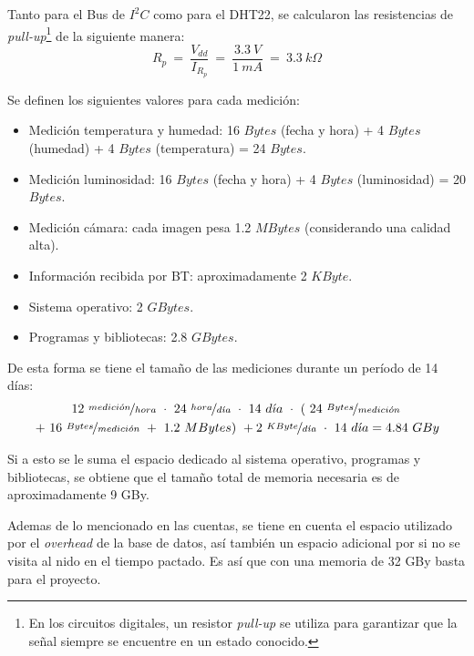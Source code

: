 Tanto para el Bus de $I^2C$ como para el DHT22, se calcularon las resistencias de \textit{pull-up}\footnote{En los circuitos digitales, un resistor \textit{pull-up} se utiliza para garantizar que la señal siempre se encuentre en un estado conocido.} de la siguiente manera:
\begin{equation}
	R_p \ = \  \frac{V_{dd}}{I_{R_p}} \ = \ \frac{3.3 \ V}{1 \ mA} \ = \ 3.3 \ k\Omega  
\end{equation}

Se definen los siguientes valores para cada medición:
\begin{itemize}
	\item Medición temperatura y humedad: 16 $Bytes$ (fecha y hora) + 4 $Bytes$ (humedad) + 4 $Bytes$ (temperatura) = 24 $Bytes$.
	\item Medición luminosidad: 16 $Bytes$ (fecha y hora) + 4 $Bytes$ (luminosidad) = 20 $Bytes$.
	\item Medición cámara: cada imagen pesa 1.2 $MBytes$ \cite{ref:rpicam} (considerando una calidad alta).
	\item Información recibida por BT: aproximadamente 2 $KByte$.
	\item Sistema operativo: 2 $GBytes$.
	\item Programas y bibliotecas: 2.8 $GBytes$.
\end{itemize}

De esta forma se tiene el tamaño de las mediciones durante un período de 14 días:
\begin{multline*}
	12 \ \nicefrac{medici\acute{o}n}{hora} \  \cdot \ 24 \ \nicefrac{hora}{d\acute{\imath}a} \  \cdot \ 14 \ d\acute{\imath}a \  \cdot \ \left( \ 24 \  \nicefrac{Bytes}{medici\acute{o}n} \right. \\ \left. + \ 16 \ \nicefrac{Bytes}{medici\acute{o}n} \ + \ 1.2 \ MBytes \right) \ + 2 \ \nicefrac{KByte}{d\acute{\imath}a} \  \cdot \  14 \ d\acute{\imath}a = 4.84 \ GBy
\end{multline*}



Si a esto se le suma el espacio dedicado al sistema operativo, programas y bibliotecas, se obtiene que el tamaño total de memoria necesaria es de aproximadamente 9 GBy.

Ademas de lo mencionado en las cuentas, se tiene en cuenta el espacio utilizado por el \textit{overhead} de la base de datos, así también un espacio adicional por si no se visita al nido en el tiempo pactado. Es así que con una memoria de 32 GBy basta para el proyecto.